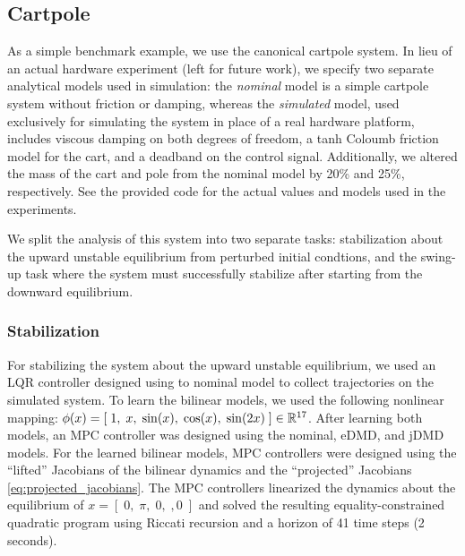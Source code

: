 \documentclass{article}
\begin{document}
\subsection{Cartpole}
As a simple benchmark example, we use the canonical cartpole system. In lieu of an actual 
hardware experiment (left for future work), we specify two separate analytical models used 
in simulation: the \textit{nominal} model is a simple cartpole system without friction or 
damping, whereas the \textit{simulated} model, used exclusively for simulating the system
in place of a real hardware platform, includes viscous damping on both degrees of freedom,
a tanh Coloumb friction model for the cart, and a deadband on the control signal. 
Additionally, we altered the mass of the cart and pole from the nominal model by 20\% and 
25\%, respectively. See the provided code for the actual values and models used in the 
experiments.

We split the analysis of this system into two separate tasks: stabilization about the upward
unstable equilibrium from perturbed initial condtions, and the swing-up task where the 
system must successfully stabilize after starting from the downward equilibrium.

\subsubsection{Stabilization}

For stabilizing the system about the upward unstable equilibrium, we used an LQR controller
designed using to nominal model to collect trajectories on the simulated system.  To learn
the bilinear models, we used the following nonlinear mapping: $\phi(x) = [\; 1,\; x,\;
\sin(x),\; \cos(x),\; \sin(2x)\; ] \in \mathbb{R}^{17}$.  After learning both models, an MPC
controller was designed using the nominal, eDMD, and jDMD models. For the learned bilinear
models, MPC controllers were designed using the ``lifted'' Jacobians of the bilinear 
dynamics and the ``projected'' Jacobians \eqref{eq:projected_jacobians}. The MPC controllers
linearized the dynamics about the equilibrium of $x = [\;0,\; \pi,\; 0,\;, 0\;]$ and solved
the resulting equality-constrained quadratic program using Riccati recursion and a horizon
of 41 time steps (2 seconds). 
\end{document}

